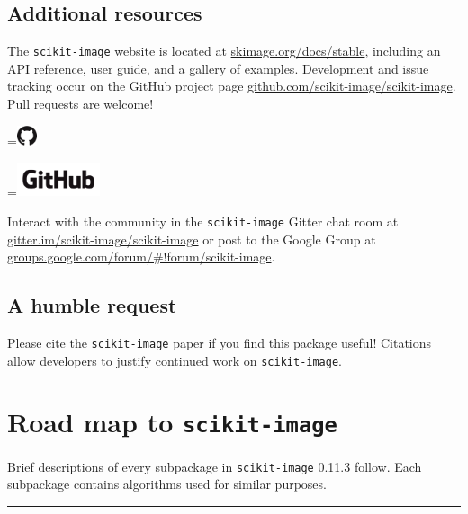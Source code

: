 \documentclass[nohyper, %
               ]{tufte-handout}
\newcommand{\release}{0.11.3\xspace} %
\DeclareRobustCommand{\ski}{\texttt{scikit-image}\xspace}
\newcommand*{\vcenteredhbox}[1]{\begingroup
\setbox0=\hbox{#1}\parbox{\wd0}{\box0}\endgroup}
\begin{document}
\subsection{Additional resources} %
  \label{sub:additional_resources}
  The \ski website is located at \url{skimage.org/docs/stable}, including an API reference, user guide, and a gallery of examples. Development and issue tracking occur on the GitHub project page \url{github.com/scikit-image/scikit-image}. Pull requests are welcome!\\\medskip
  \begin{marginfigure}[-1.7cm]%
    \centering%
    \begingroup
      \vcenteredhbox{\includegraphics[height=0.59cm]{GitHub-Mark-large.png}}%
      \vcenteredhbox{\includegraphics[height=1cm]{GitHub-Logo.png}}%
    \endgroup
    \label{fig:GitHub}%
  \end{marginfigure}%
  \noindent
  Interact with the community in the \ski Gitter chat room at \url{gitter.im/scikit-image/scikit-image} or post to the Google Group at \url{groups.google.com/forum/#!forum/scikit-image}.

\subsection{A humble request} %
  \label{sub:a_humble_request}
  Please cite the \ski paper\cite{van2014scikit} if you find this package useful! Citations allow developers to justify continued work on \ski.

\newpage%
\section{Road map to \ski} %
  \label{sec:road_map}
  Brief descriptions of every subpackage in \ski \release follow. Each subpackage contains algorithms used for similar purposes.\\

  \noindent%
  \begingroup%
    \begin{center}%
      \textcolor{DarkGray}{\rule{0.7\textwidth}{.4pt}}\\%
    \end{center}%
  \endgroup%
\end{document}
